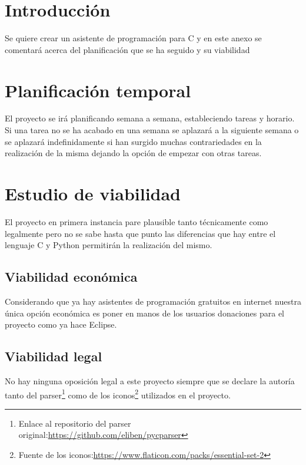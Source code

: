 
\section{Introducción}

Se quiere crear un asistente de programación para C y en este anexo se comentará acerca del planificación que se ha seguido y su viabilidad

\section{Planificación temporal}

El proyecto se irá planificando semana a semana, estableciendo tareas y horario.
Si una tarea no se ha acabado en una semana se aplazará a la siguiente semana o se aplazará indefinidamente si han surgido muchas contrariedades en la realización de la misma dejando la opción de empezar con otras tareas.

\section{Estudio de viabilidad}

El proyecto en primera instancia pare plausible tanto técnicamente como legalmente pero no se sabe hasta que punto las diferencias que hay entre el lenguaje C y Python permitirán la realización del mismo.

\subsection{Viabilidad económica}

Considerando que ya hay asistentes de programación gratuitos en internet nuestra única opción económica es poner en manos de los usuarios donaciones para el proyecto como ya hace Eclipse.

\subsection{Viabilidad legal}

No hay ninguna oposición legal a este proyecto siempre que se declare la autoría tanto del parser\footnote{Enlace al repositorio del parser original:\url{https://github.com/eliben/pycparser}} como de los iconos\footnote{Fuente de los iconos:\url{https://www.flaticon.com/packs/essential-set-2}} utilizados en el proyecto.

